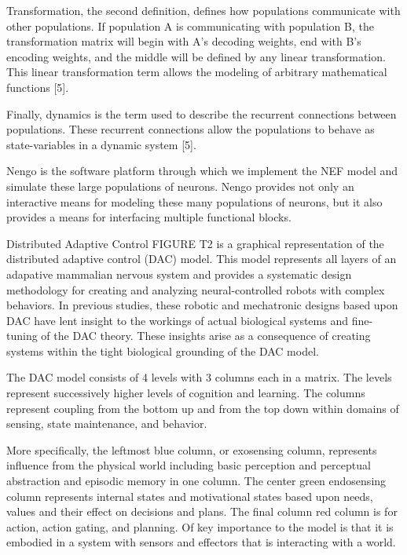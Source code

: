 Transformation, the second definition, defines how populations communicate
with other populations. If population A is communicating with population
B, the transformation matrix will begin with A\textquoteright{}s decoding
weights, end with B\textquoteright{}s encoding weights, and the middle
will be defined by any linear transformation. This linear transformation
term allows the modeling of arbitrary mathematical functions {[}5{]}.

Finally, dynamics is the term used to describe the recurrent connections
between populations. These recurrent connections allow the populations
to behave as state-variables in a dynamic system {[}5{]}.

Nengo is the software platform through which we implement the NEF
model and simulate these large populations of neurons. Nengo provides
not only an interactive means for modeling these many populations
of neurons, but it also provides a means for interfacing multiple
functional blocks.

Distributed Adaptive Control FIGURE T2 is a graphical representation
of the distributed adaptive control (DAC) model. This model represents
all layers of an adapative mammalian nervous system and provides a
systematic design methodology for creating and analyzing neural-controlled
robots with complex behaviors. In previous studies, these robotic
and mechatronic designs based upon DAC have lent insight to the workings
of actual biological systems and fine-tuning of the DAC theory. These
insights arise as a consequence of creating systems within the tight
biological grounding of the DAC model.

The DAC model consists of 4 levels with 3 columns each in a matrix.
The levels represent successively higher levels of cognition and learning.
The columns represent coupling from the bottom up and from the top
down within domains of sensing, state maintenance, and behavior.

More specifically, the leftmost blue column, or exosensing column,
represents influence from the physical world including basic perception
and perceptual abstraction and episodic memory in one column. The
center green endosensing column represents internal states and motivational
states based upon needs, values and their effect on decisions and
plans. The final column red column is for action, action gating, and
planning. Of key importance to the model is that it is embodied in
a system with sensors and effectors that is interacting with a world.

